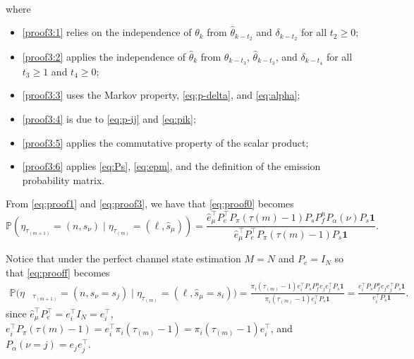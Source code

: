 \documentclass[journal,twoside,web]{ieeecolor}
\begin{document}
\begin{figure*}[ht]
\begin{align}
\begin{aligned}
\end{aligned}
\end{align}
where 
\begin{itemize}
    \item \eqref{proof3:1} relies on the independence of $\theta_{k}$ from $\hat{\theta}_{k-t_2}$ and $\delta_{k-t_2}$ for all $t_2\geq 0$;
    \item \eqref{proof3:2} applies the independence of $\hat{\theta}_{k}$ from $\theta_{k-t_3}$, $\hat{\theta}_{k-t_3}$, and $\delta_{k-t_4}$ for all $t_3\geq 1$ and $t_4\geq 0$;
    \item \eqref{proof3:3} uses the Markov property, \eqref{eq:p-delta}, and \eqref{eq:alpha};
    \item \eqref{proof3:4} is due to \eqref{eq:p-ij} and \eqref{eq:pik};
    \item \eqref{proof3:5} applies the commutative property of the scalar product;
    \item \eqref{proof3:6} applies \eqref{eq:Ps}, \eqref{eq:epm}, and the definition of the emission probability matrix.
\end{itemize}
\end{figure*}
\begin{figure*}[ht]
\raggedright
From \eqref{eq:proof1} and \eqref{eq:proof3}, we have that \eqref{eq:proof0} becomes
\begin{equation}\label{eq:prooff}
\mathbb{P}(\eta_{\tau_{(m+1)}}^{} = (n,\hat{s}_{\nu}) \mid \eta_{\tau_{(m)}}^{} = (\ell,\hat{s}_{\mu})) =
    \frac{\hat{e}_{\mu}^{\top} P_{e}^{\top} P_{\pi}(\tau{(m)}-1) P_{s} P_{f}^{n} P_{\alpha}(\nu) P_{s} \mathbf{1}}{\hat{e}_{\mu}^{\top} P_{e}^{\top} P_{\pi}(\tau{(m)}-1) P_{s}\mathbf{1}}.
\end{equation}
\end{figure*}
\begin{figure*}[ht]
\raggedright
Notice that under the perfect channel state estimation $M=N$ and $P_e = I_{N}$ so that \eqref{eq:prooff} becomes
\begin{align}
\mathbb{P}(\eta&_{\tau_{(m+1)}}^{} = (n,\hat{s}_{\nu}=s_j) \mid \eta_{\tau_{(m)}}^{} = (\ell,\hat{s}_{\mu}=s_i)) =
    \frac{\pi_{i}(\tau_{(m)}-1)e_{i}^{\top} P_{s} P_{f}^{n} e_{j}e_{j}^{\top} P_{s} \mathbf{1}}{\pi_{i}(\tau_{(m)}-1)e_{i}^{\top} P_{s}\mathbf{1}} = \frac{e_{i}^{\top} P_{s} P_{f}^{n} e_{j}e_{j}^{\top} P_{s} \mathbf{1}}{e_{i}^{\top} P_{s}\mathbf{1}}.
\end{align}
since $\hat{e}_{\mu}^{\top} P_{e}^{\top} = e_{i}^{\top} I_{N} = e_{i}^{\top}$, $e_{i}^{\top} P_{\pi}(\tau{(m)}-1)=e_{i}^{\top}\pi_{i}(\tau_{(m)}-1)=\pi_{i}(\tau_{(m)}-1)e_{i}^{\top}$, and $P_{\alpha}(\nu=j)=e_{j}e_{j}^{\top}$.
\end{figure*}
\end{document}

